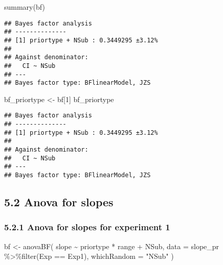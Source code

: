 \documentclass[
]{article}
\newenvironment{Shaded}{\begin{snugshade}}{\end{snugshade}}
\newcommand{\AttributeTok}[1]{\textcolor[rgb]{0.77,0.63,0.00}{#1}}
\newcommand{\DecValTok}[1]{\textcolor[rgb]{0.00,0.00,0.81}{#1}}
\newcommand{\FunctionTok}[1]{\textcolor[rgb]{0.00,0.00,0.00}{#1}}
\newcommand{\NormalTok}[1]{#1}
\newcommand{\OtherTok}[1]{\textcolor[rgb]{0.56,0.35,0.01}{#1}}
\newcommand{\SpecialCharTok}[1]{\textcolor[rgb]{0.00,0.00,0.00}{#1}}
\newcommand{\StringTok}[1]{\textcolor[rgb]{0.31,0.60,0.02}{#1}}
\begin{document}
\begin{Shaded}
\begin{Highlighting}[]
\FunctionTok{summary}\NormalTok{(bf)}
\end{Highlighting}
\end{Shaded}

\begin{verbatim}
## Bayes factor analysis
## --------------
## [1] priortype + NSub : 0.3449295 ±3.12%
## 
## Against denominator:
##   CI ~ NSub 
## ---
## Bayes factor type: BFlinearModel, JZS
\end{verbatim}

\begin{Shaded}
\begin{Highlighting}[]
\NormalTok{ bf\_priortype }\OtherTok{\textless{}{-}}\NormalTok{ bf[}\DecValTok{1}\NormalTok{]}
\NormalTok{ bf\_priortype}
\end{Highlighting}
\end{Shaded}

\begin{verbatim}
## Bayes factor analysis
## --------------
## [1] priortype + NSub : 0.3449295 ±3.12%
## 
## Against denominator:
##   CI ~ NSub 
## ---
## Bayes factor type: BFlinearModel, JZS
\end{verbatim}

\hypertarget{anova-for-slopes}{%
\subsection{5.2 Anova for slopes}\label{anova-for-slopes}}

\hypertarget{anova-for-slopes-for-experiment-1}{%
\subsubsection{5.2.1 Anova for slopes for experiment
1}\label{anova-for-slopes-for-experiment-1}}

\begin{Shaded}
\begin{Highlighting}[]
\NormalTok{bf }\OtherTok{\textless{}{-}} \FunctionTok{anovaBF}\NormalTok{( slope }\SpecialCharTok{\textasciitilde{}}\NormalTok{ priortype }\SpecialCharTok{*}\NormalTok{ range }\SpecialCharTok{+}\NormalTok{ NSub, }\AttributeTok{data =}\NormalTok{ slope\_pr }\SpecialCharTok{\%\textgreater{}\%}\FunctionTok{filter}\NormalTok{(Exp }\SpecialCharTok{==} \StringTok{\textquotesingle{}Exp1\textquotesingle{}}\NormalTok{), }\AttributeTok{whichRandom =} \StringTok{"NSub"}\NormalTok{ ) }
\end{Highlighting}
\end{Shaded}
\end{document}
